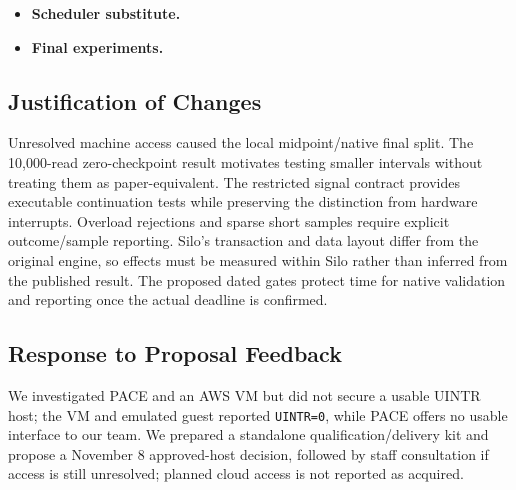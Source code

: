 \documentclass[sigconf,nonacm]{acmart}
\begin{document}
\begin{itemize}
{regions precede native delivery/switching. The glibc voluntary ABI tests do
not validate interrupt-time state. Native I12--I17 acceptance gates remain mandatory.}
\item \textbf{Scheduler substitute.} 
\item \textbf{Final experiments.} 
\end{itemize}

\subsection{Justification of Changes}
Unresolved machine access caused the local midpoint/native final split.
The 10,000-read zero-checkpoint result motivates testing smaller intervals
without treating them as paper-equivalent. The restricted signal contract
provides executable continuation tests while preserving the distinction from
hardware interrupts. Overload rejections and sparse short samples require
explicit outcome/sample reporting. Silo's transaction and data layout differ
from the original engine, so effects must be measured within Silo rather than
inferred from the published result. The proposed dated gates protect time for
native validation and reporting once the actual deadline is confirmed.

\subsection{Response to Proposal Feedback}
We investigated PACE and an AWS VM but did not secure a usable UINTR host;
the VM and emulated guest reported \texttt{UINTR=0}, while PACE offers no usable
interface to our team. We prepared a standalone qualification/delivery kit and
propose a November 8 approved-host decision, followed by staff consultation if
access is still unresolved; planned cloud access is not reported as acquired.
\end{document}
